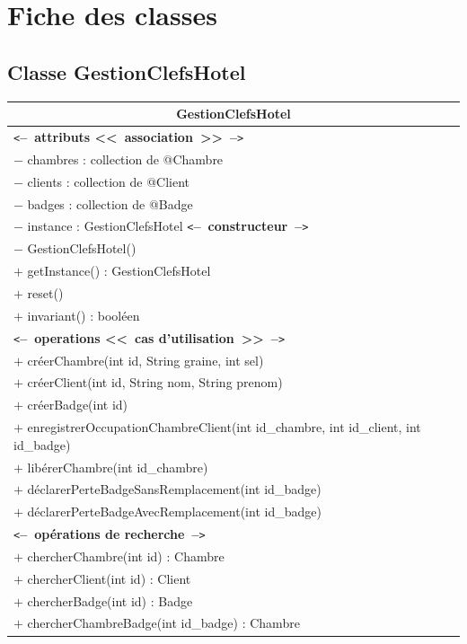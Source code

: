 \documentclass[11pt,article]{article}
\newcommand{\cmt}[1]{\texttt{<}\textbf{--~#1~--}\texttt{>}}
\begin{document}
\clearpage
\newpage

\section{Fiche des classes}

\subsection{Classe \textsf{GestionClefsHotel}}

\begin{center}
\begin{longtable}{|p{15cm}|}
\hline
\multicolumn{1}{|c|}{{\Large \textsf{GestionClefsHotel}}} \\
\hline
\cmt{attributs <<~association~>>}\\
$-$ chambres : collection de @Chambre \\
$-$ clients : collection de @Client \\
$-$ badges : collection de @Badge \\
$-$ instance : GestionClefsHotel
\hline
\cmt{constructeur} \\
$-$ GestionClefsHotel()\\
$+$ getInstance() : GestionClefsHotel\\
$+$ reset()\\
$+$ invariant() : booléen\\
\cmt{operations <<~cas d'utilisation~>>} \\
$+$ créerChambre(int id, String graine, int sel) \\
$+$ créerClient(int id, String nom, String prenom) \\
$+$ créerBadge(int id) \\
$+$ enregistrerOccupationChambreClient(int id\_chambre, int id\_client, int id\_badge) \\
$+$ libérerChambre(int id\_chambre) \\
$+$ déclarerPerteBadgeSansRemplacement(int id\_badge) \\
$+$ déclarerPerteBadgeAvecRemplacement(int id\_badge) \\
\cmt{opérations de recherche} \\
$+$ chercherChambre(int id) : Chambre \\
$+$ chercherClient(int id) : Client\\
$+$ chercherBadge(int id) : Badge\\
$+$ chercherChambreBadge(int id\_badge) : Chambre \\
\hline
\end{longtable}%
\end{center}
\clearpage
\newpage
\end{document}
